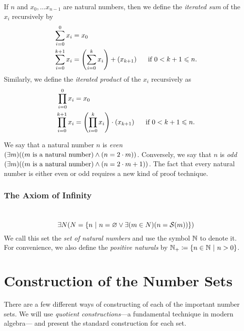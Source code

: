 \begin{definition}
    If $n$ and $x_0, \dots x_{n - 1}$ are natural numbers,
    then we define the \emph{iterated sum} of the $x_i$ recursively by
    \begin{align*}
        \sum_{i = 0}^{0}x_i &= x_0\\
        \sum_{i = 0}^{k + 1}x_i &= \pn*{\sum_{i = 0}^{k}x_i} + \pn*{x_{k + 1}}~~~~\text{ if } 0 < k + 1 \leq n.
    \end{align*}
    Similarly, we define the \emph{iterated product} of the $x_i$ recursively as
    \begin{align*}
        \prod_{i = 0}^{0}x_i &= x_0\\
        \prod_{i = 0}^{k + 1}x_i &= \pn*{\prod_{i = 0}^{k}x_i} \cdot \pn*{x_{k + 1}}~~~~\text{ if } 0 < k + 1 \leq n.
    \end{align*}
\end{definition}

\begin{definition}[Parity]
    We say that a natural number $n$ is \emph{even} \iffbydefn
    $\pn*{\exists m}\pn*{\pn*{m \text{ is a natural number}} \meet \pn*{n = 2 \cdot m}}$.
    Conversely, we say that $n$ is \emph{odd} \iffbydefn
    $\pn*{\exists m}\pn*{\pn*{m \text{ is a natural number}} \meet \pn*{n = 2 \cdot m + 1}}$.
    The fact that every natural number is either even or odd requires a new kind of proof technique.
\end{definition}

\subsection{The Axiom of Infinity}
\begin{axiom}[Infinity]
    ~\vspace{-\baselineskip}
    \[
        \exists N \pn*{N = \set*{n \suchthat n = \emptyset \join \exists\pn*{m \in N}\pn*{n = \successor{m}}}}
    \]
    We call this set the \emph{set of natural numbers} and use the symbol $\mathbb{N}$ to denote it.
    For convenience,
    we also define the \emph{positive naturals} by $\N_+ \defn \set*{n \in \N \suchthat n > 0}$.
\end{axiom}

\appendix
\chapter{Construction of the Number Sets}
There are a few different ways of constructing of each of the important number sets.
We will use \emph{quotient constructions}---a fundamental technique in modern algebra---%
and present the standard construction for each set.

